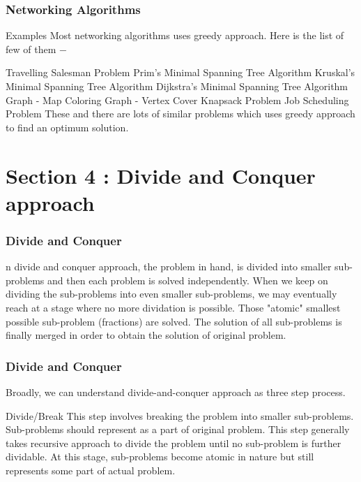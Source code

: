 \documentclass{beamer}
\begin{document}
\begin{frame}
\frametitle{Networking Algorithms}
\large
Examples
Most networking algorithms uses greedy approach. Here is the list of few of them −

Travelling Salesman Problem
Prim's Minimal Spanning Tree Algorithm
Kruskal's Minimal Spanning Tree Algorithm
Dijkstra's Minimal Spanning Tree Algorithm
Graph - Map Coloring
Graph - Vertex Cover
Knapsack Problem
Job Scheduling Problem
These and there are lots of similar problems which uses greedy approach to find an optimum solution.

\end{frame}
\section{Section 4 : Divide and Conquer approach}
\begin{frame}
\frametitle{Divide and Conquer}
\large
n divide and conquer approach, the problem in hand, is divided into smaller sub-problems and then each problem is solved independently. When we keep on dividing the sub-problems into even smaller sub-problems, we may eventually reach at a stage where no more dividation is possible. Those "atomic" smallest possible sub-problem (fractions) are solved. The solution of all sub-problems is finally merged in order to obtain the solution of original problem.
\end{frame}
\begin{frame}
\frametitle{Divide and Conquer}
\large
Broadly, we can understand divide-and-conquer approach as three step process.

Divide/Break
This step involves breaking the problem into smaller sub-problems. Sub-problems should represent as a part of original problem. This step generally takes recursive approach to divide the problem until no sub-problem is further dividable. At this stage, sub-problems become atomic in nature but still represents some part of actual problem.
\end{frame}
\end{document}
